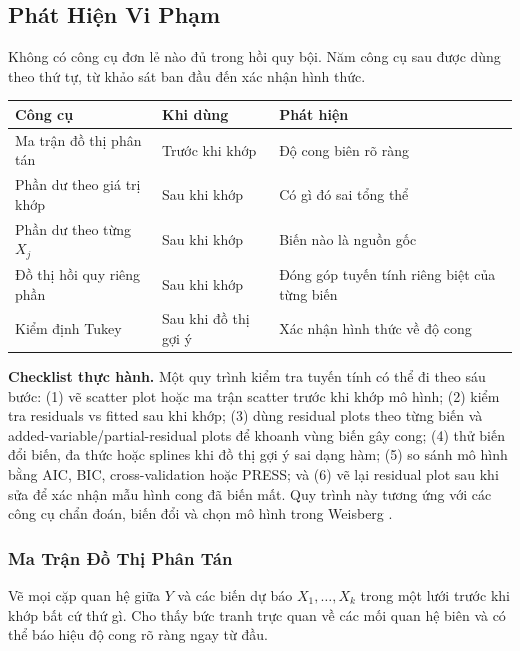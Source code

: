 \subsection{Phát Hiện Vi Phạm}

Không có công cụ đơn lẻ nào đủ trong hồi quy bội. Năm công cụ sau được dùng theo thứ tự, từ khảo sát ban đầu đến xác nhận hình thức.

\begin{center}
\begin{tabular}{@{}llp{6.2cm}@{}}
\toprule
\textbf{Công cụ} & \textbf{Khi dùng} & \textbf{Phát hiện} \\
\midrule
Ma trận đồ thị phân tán   & Trước khi khớp  & Độ cong biên rõ ràng \\
Phần dư theo giá trị khớp & Sau khi khớp    & Có gì đó sai tổng thể \\
Phần dư theo từng $X_j$   & Sau khi khớp    & Biến nào là nguồn gốc \\
Đồ thị hồi quy riêng phần & Sau khi khớp    & Đóng góp tuyến tính riêng biệt của từng biến \\
Kiểm định Tukey            & Sau khi đồ thị gợi ý & Xác nhận hình thức về độ cong \\
\bottomrule
\end{tabular}
\end{center}


\textbf{Checklist thực hành.} Một quy trình kiểm tra tuyến tính có thể đi theo sáu bước: (1) vẽ scatter plot hoặc ma trận scatter trước khi khớp mô hình; (2) kiểm tra residuals vs fitted sau khi khớp; (3) dùng residual plots theo từng biến và added-variable/partial-residual plots để khoanh vùng biến gây cong; (4) thử biến đổi biến, đa thức hoặc splines khi đồ thị gợi ý sai dạng hàm; (5) so sánh mô hình bằng AIC, BIC, cross-validation hoặc PRESS; và (6) vẽ lại residual plot sau khi sửa để xác nhận mẫu hình cong đã biến mất. Quy trình này tương ứng với các công cụ chẩn đoán, biến đổi và chọn mô hình trong Weisberg \cite[Ch.~1; Sec.~3.1.2; Sec.~3.4.8; Ch.~5; Ch.~8; Sec.~9.1; Sec.~10.2]{weisberg2014applied}.

\subsubsection{Ma Trận Đồ Thị Phân Tán}

Vẽ mọi cặp quan hệ giữa $Y$ và các biến dự báo $X_1, \ldots, X_k$ trong một lưới trước khi khớp bất cứ thứ gì. Cho thấy bức tranh trực quan về các mối quan hệ biên và có thể báo hiệu độ cong rõ ràng ngay từ đầu.

